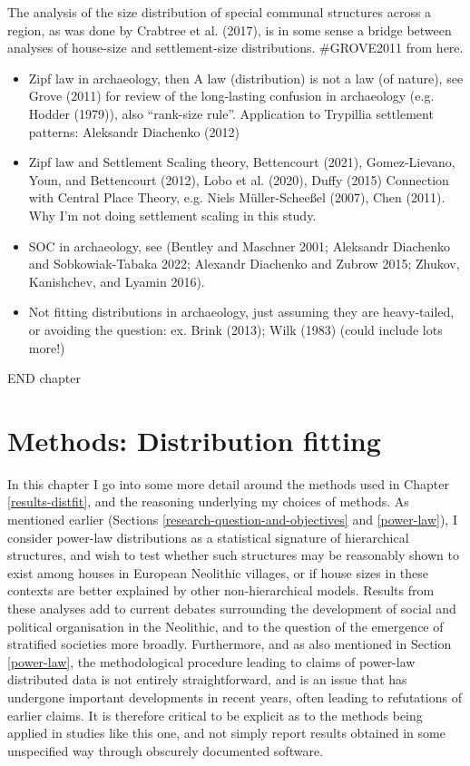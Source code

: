 \documentclass[
  12pt,
  a4paper, twoside]{book}
\begin{document}
The analysis of the size distribution of special communal structures across a region, as was done by Crabtree et al. (2017), is in some sense a bridge between analyses of house-size and settlement-size distributions. \#GROVE2011 from here.

\begin{itemize}
\item
  Zipf law in archaeology, then A law (distribution) is not a law (of nature), see Grove (2011) for review of the long-lasting confusion in archaeology (e.g. Hodder (1979)), also ``rank-size rule''. Application to Trypillia settlement patterns: Aleksandr Diachenko (2012)
\item
  Zipf law and Settlement Scaling theory, Bettencourt (2021), Gomez-Lievano, Youn, and Bettencourt (2012), Lobo et al. (2020), Duffy (2015) Connection with Central Place Theory, e.g. Niels Müller-Scheeßel (2007), Chen (2011). Why I'm not doing settlement scaling in this study.
\item
  SOC in archaeology, see (Bentley and Maschner 2001; Aleksandr Diachenko and Sobkowiak-Tabaka 2022; Alexandr Diachenko and Zubrow 2015; Zhukov, Kanishchev, and Lyamin 2016).
\item
  Not fitting distributions in archaeology, just assuming they are heavy-tailed, or avoiding the question: ex. Brink (2013); Wilk (1983) (could include lots more!)
\end{itemize}

END chapter

\hypertarget{methods-distfit}{%
\chapter{Methods: Distribution fitting}\label{methods-distfit}}

In this chapter I go into some more detail around the methods used in Chapter \ref{results-distfit}, and the reasoning underlying my choices of methods. As mentioned earlier (Sections \ref{research-question-and-objectives} and \ref{power-law}), I consider power-law distributions as a statistical signature of hierarchical structures, and wish to test whether such structures may be reasonably shown to exist among houses in European Neolithic villages, or if house sizes in these contexts are better explained by other non-hierarchical models. Results from these analyses add to current debates surrounding the development of social and political organisation in the Neolithic, and to the question of the emergence of stratified societies more broadly. Furthermore, and as also mentioned in Section \ref{power-law}, the methodological procedure leading to claims of power-law distributed data is not entirely straightforward, and is an issue that has undergone important developments in recent years, often leading to refutations of earlier claims. It is therefore critical to be explicit as to the methods being applied in studies like this one, and not simply report results obtained in some unspecified way through obscurely documented software.
\end{document}
